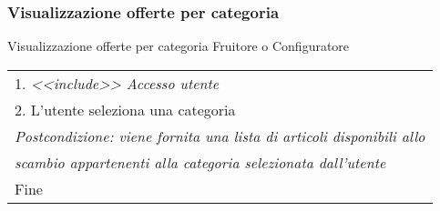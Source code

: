\begin{minipage}{\textwidth}
    \subsubsection{Visualizzazione offerte per categoria}
    \usecase
        {Visualizzazione offerte per categoria}
        {
            Fruitore o Configuratore %
        }
        {
            \begin{tabular}{l}
                1. \textit{<<include>> Accesso utente}\\
                2. L'utente seleziona una categoria\\
                \textit{Postcondizione: viene fornita una lista di articoli disponibili allo}\\
                \textit{scambio appartenenti alla categoria selezionata dall'utente}\\
                Fine
            \end{tabular}\\


        }
        \vspace{0.5cm}
\end{minipage}